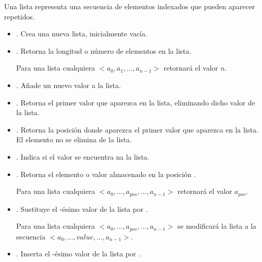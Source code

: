 


\begin{definition}[Lista]{}\label{def:Lista}

Una lista representa una secuencia de elementos indexados que pueden aparecer repetidos.

\begin{itemize}
\item {}. Crea una nueva lista, inicialmente vacía.

\item {}. Retorna la longitud o número de elementos en la lista.

Para una lista cualquiera $<a_0, a_1, \ldots, a_{n-1}>$ retornará el valor $n$.

\item {}. Añade un nuevo valor a la lista.

\item {}. Retorna el primer valor  que aparezca en la lista, eliminando dicho valor de la lista.

\item {}. Retorna la posición donde aparezca el primer valor  que aparezca en la lista. El elemento no se elimina de la lista.

\item {}. Indica si el valor  se encuentra na la lista.

\item {}. Retorna el elemento o valor almacenado en la posición . 

Para una lista cualquiera $<a_0, \ldots, a_{pos}, \ldots, a_{n-1}>$ retornará el valor $a_{pos}$.


\item {}. Sustituye el -ésimo valor de la lista por . 

Para una lista cualquiera $<a_0, \ldots, a_{pos}, \ldots, a_{n-1}>$ se modificará la lista a la secuencia $<a_0, \ldots, value, \ldots, a_{n-1}>$.

\item {}. Inserta el  -ésimo valor de la lista por . 


\end{itemize}
\end{definition}
